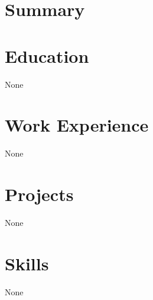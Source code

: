 \documentclass{article}%
\title%
\author{ \ }%
\date{}%
\begin{document}
%
\normalsize%
\maketitle%
\section{Summary}%
\label{sec:Summary}%

%
\section{Education}%
\label{sec:Education}%
None

%
\section{Work Experience}%
\label{sec:WorkExperience}%
None

%
\section{Projects}%
\label{sec:Projects}%
None

%
\section{Skills}%
\label{sec:Skills}%
None

%
\end{document}
